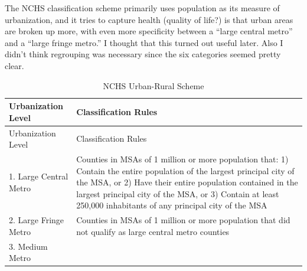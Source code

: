 \documentclass[10pt,]{article}
\begin{document}
The NCHS classification scheme primarily uses population as its measure
of urbanization, and it tries to capture health (quality of life?) is
that urban areas are broken up more, with even more specificity between
a ``large central metro'' and a ``large fringe metro.'' I thought that
this turned out useful later. Also I didn't think regrouping was
necessary since the six categories seemed pretty clear.

\begin{longtable}[]{@{}ll@{}}
\caption{NCHS Urban-Rural Scheme}\tabularnewline
\toprule
\begin{minipage}[b]{0.07\columnwidth}\raggedright
Urbanization Level\strut
\end{minipage} & \begin{minipage}[b]{0.87\columnwidth}\raggedright
Classification Rules\strut
\end{minipage}\tabularnewline
\midrule
\endfirsthead
\toprule
\begin{minipage}[b]{0.07\columnwidth}\raggedright
Urbanization Level\strut
\end{minipage} & \begin{minipage}[b]{0.87\columnwidth}\raggedright
Classification Rules\strut
\end{minipage}\tabularnewline
\midrule
\endhead
\begin{minipage}[t]{0.07\columnwidth}\raggedright
1. Large Central Metro\strut
\end{minipage} & \begin{minipage}[t]{0.87\columnwidth}\raggedright
Counties in MSAs of 1 million or more population that: 1) Contain the
entire population of the largest principal city of the MSA, or 2) Have
their entire population contained in the largest principal city of the
MSA, or 3) Contain at least 250,000 inhabitants of any principal city of
the MSA\strut
\end{minipage}\tabularnewline
\begin{minipage}[t]{0.07\columnwidth}\raggedright
2. Large Fringe Metro\strut
\end{minipage} & \begin{minipage}[t]{0.87\columnwidth}\raggedright
Counties in MSAs of 1 million or more population that did not qualify as
large central metro counties\strut
\end{minipage}\tabularnewline
\begin{minipage}[t]{0.07\columnwidth}\raggedright
3. Medium Metro\strut
\end{minipage} & \begin{minipage}[t]{0.87\columnwidth}\raggedright

\end{minipage}
\end{longtable}
\end{document}
